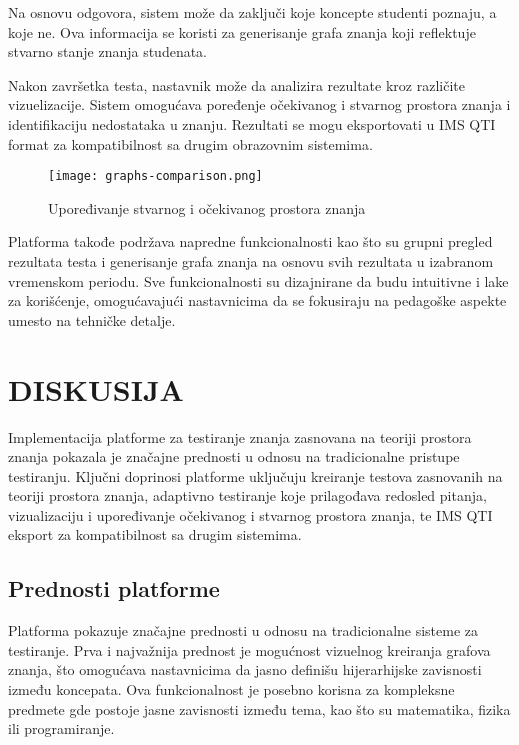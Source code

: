 \documentclass[conference]{IEEEtran}
\begin{document}
Na osnovu odgovora, sistem može da zaključi koje koncepte studenti poznaju, a koje ne. Ova informacija se koristi za generisanje grafa znanja koji reflektuje stvarno stanje znanja studenata.

Nakon završetka testa, nastavnik može da analizira rezultate kroz različite vizuelizacije. Sistem omogućava poređenje očekivanog i stvarnog prostora znanja i identifikaciju nedostataka u znanju. Rezultati se mogu eksportovati u IMS QTI format za kompatibilnost sa drugim obrazovnim sistemima.

\begin{figure}[H]
\centering
\texttt{[image: graphs-comparison.png]}
\caption{Upoređivanje stvarnog i očekivanog prostora znanja}
\end{figure}

Platforma takođe podržava napredne funkcionalnosti kao što su grupni pregled rezultata testa i generisanje grafa znanja na osnovu svih rezultata u izabranom vremenskom periodu. Sve funkcionalnosti su dizajnirane da budu intuitivne i lake za korišćenje, omogućavajući nastavnicima da se fokusiraju na pedagoške aspekte umesto na tehničke detalje.

\section{DISKUSIJA}

Implementacija platforme za testiranje znanja zasnovana na teoriji prostora znanja pokazala je značajne prednosti u odnosu na tradicionalne pristupe testiranju. Ključni doprinosi platforme uključuju kreiranje testova zasnovanih na teoriji prostora znanja, adaptivno testiranje koje prilagođava redosled pitanja, vizualizaciju i upoređivanje očekivanog i stvarnog prostora znanja, te IMS QTI eksport za kompatibilnost sa drugim sistemima.

\subsection{Prednosti platforme}

Platforma pokazuje značajne prednosti u odnosu na tradicionalne sisteme za testiranje. Prva i najvažnija prednost je mogućnost vizuelnog kreiranja grafova znanja, što omogućava nastavnicima da jasno definišu hijerarhijske zavisnosti između koncepata. Ova funkcionalnost je posebno korisna za kompleksne predmete gde postoje jasne zavisnosti između tema, kao što su matematika, fizika ili programiranje.
\end{document}
